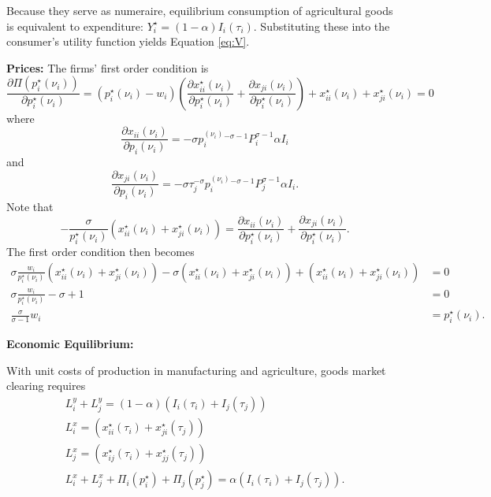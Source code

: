 \documentclass{puthesis}
\begin{document}
Because they serve as numeraire, equilibrium consumption of agricultural
goods is equivalent to expenditure:
\(Y_i^\star = (1 - \alpha) I_i(\tau_i)\). Substituting these into the
consumer's utility function yields Equation \ref{eq:V}.

\textbf{Prices:} The firms' first order condition is \[
\frac{\partial \Pi \left( p_i^\star(\nu_i) \right)}{\partial p_i^\star(\nu_i)} = \left( p_i^\star(\nu_i) - w_i \right) \left( \frac{\partial x_{ii}^\star(\nu_i)}{\partial p_i^\star(\nu_i)} + \frac{\partial x_{ji}(\nu_i)}{\partial p_i^\star(\nu_i)} \right) + x_{ii}^\star(\nu_i) + x_{ji}^\star(\nu_i) = 0
\] where \[
\frac{\partial x_{ii}(\nu_i)}{\partial p_i(\nu_i)} = - \sigma p_i^(\nu_i)^{- \sigma - 1} P_i^{\sigma - 1} \alpha I_i
\] and \[
\frac{\partial x_{ji}(\nu_i)}{\partial p_i(\nu_i)} = - \sigma \tau_j^{-\sigma} p_i^(\nu_i)^{- \sigma - 1} P_j^{\sigma - 1} \alpha I_i .
\] Note that \[
- \frac{\sigma}{p_i^\star(\nu_i)} \left( x_{ii}^\star(\nu_i) + x_{ji}^\star(\nu_i) \right) = \frac{\partial x_{ii}(\nu_i)}{\partial p_i^\star(\nu_i)} + \frac{\partial x_{ji}(\nu_i)}{\partial p_i^\star(\nu_i)} .
\] The first order condition then becomes \begin{align*}
\sigma \frac{w_i}{p_i^\star(\nu_i)} \left( x_{ii}^\star(\nu_i) + x_{ji}^\star(\nu_i) \right) - \sigma \left( x_{ii}^\star(\nu_i) + x_{ji}^\star(\nu_i) \right) + \left( x_{ii}^\star(\nu_i) + x_{ji}^\star(\nu_i) \right) &= 0 \\
\sigma \frac{w_i}{p_i^\star(\nu_i)} - \sigma + 1 &= 0 \\
\frac{\sigma}{\sigma - 1} w_i &=  p_i^\star(\nu_i) .
\end{align*}

\textbf{Economic Equilibrium:}

With unit costs of production in manufacturing and agriculture, goods
market clearing requires \begin{equation*}
\begin{split}
L_i^y + L_j^y = (1 - \alpha) \left( I_i(\tau_i) + I_j(\tau_j) \right) \\
L_i^x = \left( x_{ii}^\star(\tau_i) + x_{ji}^\star(\tau_j) \right) \\
L_j^x = \left( x_{ij}^\star(\tau_i) + x_{jj}^\star(\tau_j) \right) \\
L_i^x + L_j^x + \Pi_i(p_i^\star) + \Pi_j(p_j^\star) = \alpha \left( I_i(\tau_i) + I_j(\tau_j) \right) .
\end{split}
\end{equation*}
\end{document}
